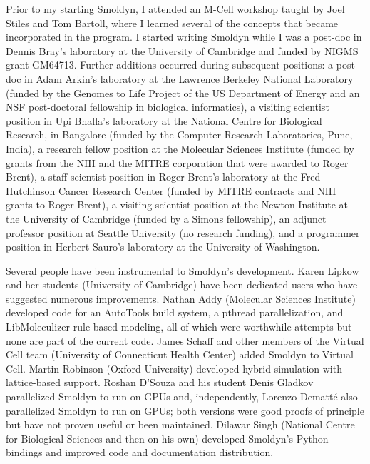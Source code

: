 \documentclass {book}
\begin{document}
Prior to my starting Smoldyn, I attended an M-Cell workshop taught by Joel Stiles and Tom Bartoll, where I learned several of the concepts that became incorporated in the program. I started writing Smoldyn while I was a post-doc in Dennis Bray's laboratory at the University of Cambridge and funded by NIGMS grant GM64713. Further additions occurred during subsequent positions: a post-doc in Adam Arkin's laboratory at the Lawrence Berkeley National Laboratory (funded by the Genomes to Life Project of the US Department of Energy and an NSF post-doctoral fellowship in biological informatics), a visiting scientist position in Upi Bhalla's laboratory at the National Centre for Biological Research, in Bangalore (funded by the Computer Research Laboratories, Pune, India), a research fellow position at the Molecular Sciences Institute (funded by grants from the NIH and the MITRE corporation that were awarded to Roger Brent), a staff scientist position in Roger Brent's laboratory at the Fred Hutchinson Cancer Research Center (funded by MITRE contracts and NIH grants to Roger Brent), a visiting scientist position at the Newton Institute at the University of Cambridge (funded by a Simons fellowship), an adjunct professor position at Seattle University (no research funding), and a programmer position in Herbert Sauro's laboratory at the University of Washington.

Several people have been instrumental to Smoldyn's development. Karen Lipkow and her students (University of Cambridge) have been dedicated users who have suggested numerous improvements. Nathan Addy (Molecular Sciences Institute) developed code for an AutoTools build system, a pthread parallelization, and LibMoleculizer rule-based modeling, all of which were worthwhile attempts but none are part of the current code. James Schaff and other members of the Virtual Cell team (University of Connecticut Health Center) added Smoldyn to Virtual Cell. Martin Robinson (Oxford University) developed hybrid simulation with lattice-based support. Roshan D'Souza and his student Denis Gladkov parallelized Smoldyn to run on GPUs and, independently, Lorenzo Dematt\'{e} also parallelized Smoldyn to run on GPUs; both versions were good proofs of principle but have not proven useful or been maintained. Dilawar Singh (National Centre for Biological Sciences and then on his own) developed Smoldyn's Python bindings and improved code and documentation distribution.
\end{document}
